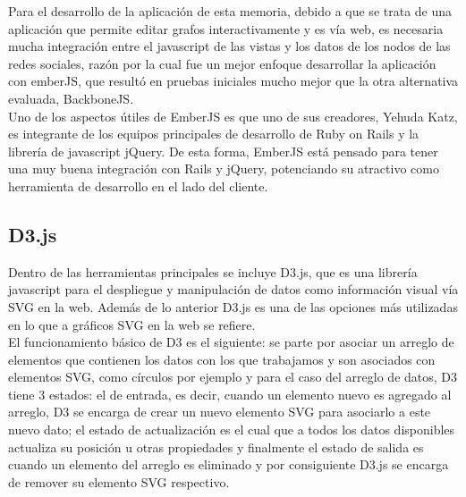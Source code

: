Para el desarrollo de la aplicación de esta memoria, debido a que se trata de una aplicación que permite editar grafos interactivamente y es vía web, es necesaria mucha integración entre el javascript de las vistas y los datos de los nodos de las redes sociales, razón por la cual fue un mejor enfoque desarrollar la aplicación con emberJS, que resultó en pruebas iniciales mucho mejor que la otra alternativa evaluada, BackboneJS\cite{backbone}.\\

Uno de los aspectos útiles de EmberJS es que uno de sus creadores, Yehuda Katz, es integrante de los equipos principales de desarrollo de Ruby on Rails y la librería de javascript jQuery. De esta forma, EmberJS está pensado para tener una muy buena integración con Rails y jQuery, potenciando su atractivo como herramienta de desarrollo en el lado del cliente.


\subsection{D3.js} %
\label{sub:d3_js}

Dentro de las herramientas principales se incluye D3.js\cite{d3}, que es una librería javascript para el despliegue y manipulación de datos como información visual vía SVG en la web. Además de lo anterior D3.js es una de las opciones más utilizadas en lo que a gráficos SVG en la web se refiere.\\

El funcionamiento básico de D3 es el siguiente: se parte por asociar un arreglo de elementos que contienen los datos con los que trabajamos y son asociados con elementos SVG, como círculos por ejemplo y para el caso del arreglo de datos, D3 tiene 3 estados: el de entrada, es decir, cuando un elemento nuevo es agregado al arreglo, D3 se encarga de crear un nuevo elemento SVG para asociarlo a este nuevo dato; el estado de actualización  es el cual que a todos los datos disponibles actualiza su posición u otras propiedades y finalmente el estado de salida es cuando un elemento del arreglo es eliminado y por consiguiente D3.js se encarga de remover su elemento SVG respectivo.

